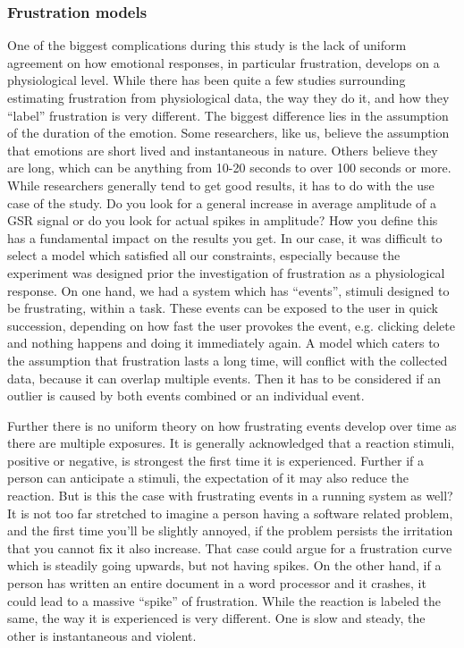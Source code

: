 \subsubsection{Frustration models}
One of the biggest complications during this study is the lack of uniform agreement on how emotional responses, in particular frustration, develops on a physiological level. While there has been quite a few studies surrounding estimating frustration from physiological data, the way they do it, and how they ``label'' frustration is very different.
The biggest difference lies in the assumption of the duration of the emotion. 
Some researchers, like us, believe the assumption that emotions are short lived and instantaneous in nature. 
Others believe they are long, which can be anything from 10-20 seconds to over 100 seconds or more. 
While researchers generally tend to get good results, it has to do with the use case of the study. 
Do you look for a general increase in average amplitude of a GSR signal or do you look for actual spikes in amplitude? 
How you define this has a fundamental impact on the results you get. 
In our case, it was difficult to select a model which satisfied all our constraints, especially because the experiment was designed prior the investigation of frustration as a physiological response. 
On one hand, we had a system which has ``events'', stimuli designed to be frustrating, within a task. These events can be exposed to the user in quick succession, depending on how fast the user provokes the event, e.g. clicking delete and nothing happens and doing it immediately again. 
A model which caters to the assumption that frustration lasts a long time, will conflict with the collected data, because it can overlap multiple events. Then it has to be considered if an outlier is caused by both events combined or an individual event. 

Further there is no uniform theory on how frustrating events develop over time as there are multiple exposures. It is
generally acknowledged that a reaction stimuli, positive or negative, is strongest the first time it is experienced.
Further if a person can anticipate a stimuli, the expectation of it may also reduce the reaction. But is this the case with frustrating events in a running system as well? It is not too far stretched to imagine a person having a software related problem, and the first time you'll be slightly annoyed, if the problem persists the irritation that you cannot fix it also increase. That case could argue for a frustration curve which is steadily going upwards, but not having spikes.
On the other hand, if a person has written an entire document in a word processor and it crashes, it could lead to a massive ``spike'' of frustration. 
While the reaction is labeled the same, the way it is experienced is very different. One is slow and steady, the other is instantaneous and violent.

